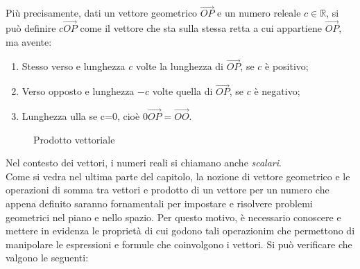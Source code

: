 Più precisamente, dati un vettore geometrico $\vec{OP}$ e un numero releale $c\in\mathds{R}$, si può definire $c\vec{OP}$ come il vettore che sta sulla stessa retta a cui appartiene $\vec{OP}$, ma avente:
\begin{enumerate}
\item Stesso verso e lunghezza $c$ volte la lunghezza di $\vec{OP}$, se $c$ è positivo;
\item Verso opposto e lunghezza $-c$ volte quella di $\vec{OP}$, se $c$ è negativo;
\item Lunghezza ulla se c=0, cioè $0\vec{OP}=\vec{OO}$.
\end{enumerate}
\begin{figure}[ht!]
  \centering
  \resizebox{6cm}{!}{
      
    }
  \caption{Prodotto vettoriale}
  \label{fig:prodottovect}
\end{figure}
Nel contesto dei vettori, i numeri reali si chiamano anche \textit{scalari}.\\
Come si vedra nel ultima parte del capitolo, la nozione di vettore geometrico e le operazioni di somma tra vettori e prodotto di un vettore per un numero che appena definito saranno fornamentali per impostare e risolvere problemi geometrici nel piano e nello spazio. Per questo motivo, è necessario conoscere e mettere in evidenza le proprietà di cui godono tali operazionim che permettono di manipolare le espressioni e formule che coinvolgono i vettori. Si può verificare che valgono le seguenti:

